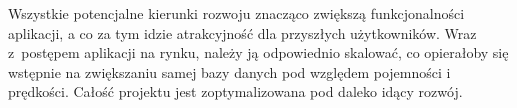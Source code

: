 Wszystkie potencjalne kierunki rozwoju znacząco zwiększą funkcjonalności aplikacji, a co za tym idzie atrakcyjność dla przyszłych użytkowników.
Wraz z~postępem aplikacji na rynku, należy ją odpowiednio skalować, co opierałoby się wstępnie na zwiększaniu samej bazy danych pod względem pojemności i prędkości.
Całość projektu jest zoptymalizowana pod daleko idący rozwój.
